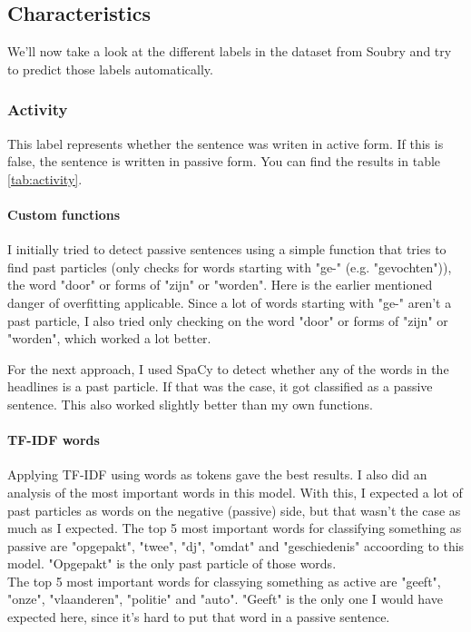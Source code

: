 \documentclass{article}
\begin{document}
\subsection{Characteristics}
We'll now take a look at the different labels in the dataset from Soubry \cite{soubry} and try to predict those labels automatically.

\subsubsection{Activity}
This label represents whether the sentence was writen in active form. If this is false, the sentence is written in passive form. You can find the results in table \ref{tab:activity}.

\paragraph{Custom functions}
I initially tried to detect passive sentences using a simple function that tries to find past particles (only checks for words starting with "ge-" (e.g. "gevochten")), the word "door" or forms of "zijn" or "worden". Here is the earlier mentioned danger of overfitting applicable. Since a lot of words starting with "ge-" aren't a past particle, I also tried only checking on the word "door" or forms of "zijn" or "worden", which worked a lot better.

For the next approach, I used SpaCy to detect whether any of the words in the headlines is a past particle. If that was the case, it got classified as a passive sentence. This also worked slightly better than my own functions.

\paragraph{TF-IDF words} Applying TF-IDF using words as tokens gave the best results. I also did an analysis of the most important words in this model. With this, I expected a lot of past particles as words on the negative (passive) side, but that wasn't the case as much as I expected. The top 5 most important words for classifying something as passive are "opgepakt", "twee", "dj", "omdat" and "geschiedenis" accoording to this model. "Opgepakt" is the only past particle of those words. \\
The top 5 most important words for classying something as active are "geeft", "onze", "vlaanderen", "politie" and "auto". "Geeft" is the only one I would have expected here, since it's hard to put that word in a passive sentence.
\end{document}
